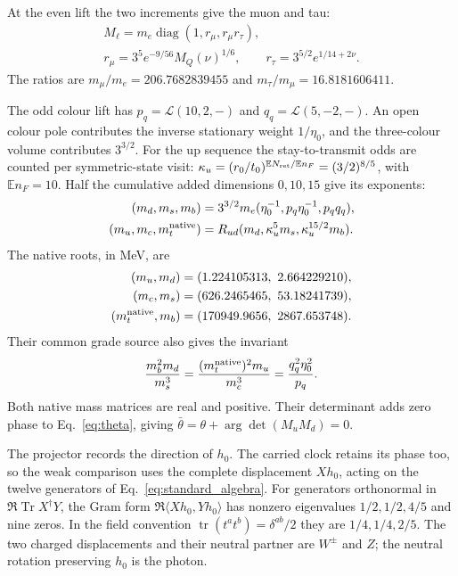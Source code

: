 \documentclass[aps,prx,reprint,longbibliography]{revtex4-2}
\providecommand{\Tr}{\operatorname{Tr}}
\providecommand{\tr}{\operatorname{tr}}
\providecommand{\diag}{\operatorname{diag}}
\providecommand{\E}{\mathbb E}
\begin{document}
At the even lift the two increments give the muon and tau:
\begin{equation}
 \begin{gathered}
 M_\ell=m_e\diag(1,r_\mu,r_\mu r_\tau),\\
 r_\mu=3^5e^{-9/56}M_Q(\nu)^{1/6},\qquad
 r_\tau=3^{5/2}e^{1/14+2\nu}.
 \end{gathered}
 \label{eq:leptons}
\end{equation}
The ratios are $m_\mu/m_e=206.7682839455$ and $m_\tau/m_\mu=16.8181606411$.

The odd colour lift has $p_q=\mathcal L(10,2,-)$ and $q_q=\mathcal L(5,-2,-)$. An open colour pole contributes the inverse stationary weight $1/\eta_0$, and the three-colour volume contributes $3^{3/2}$. For the up sequence the stay-to-transmit odds are counted per symmetric-state visit: $\kappa_u=(r_0/t_0)^{\E N_{\rm ret}/\E n_F}=(3/2)^{8/5}$, with $\E n_F=10$. Half the cumulative added dimensions $0,10,15$ give its exponents:
\begin{equation}
 \begin{split}
 (m_d,m_s,m_b)&=3^{3/2}m_e(\eta_0^{-1},p_q\eta_0^{-1},p_qq_q),\\
 (m_u,m_c,m_t^{\rm native})&=R_{ud}(m_d,\kappa_u^5m_s,\kappa_u^{15/2}m_b).
 \end{split}
 \label{eq:quarks}
\end{equation}
The native roots, in MeV, are
\[
\begin{aligned}
 (m_u,m_d)&=(1.224105313,\ 2.664229210),\\
 (m_c,m_s)&=(626.2465465,\ 53.18241739),\\
 (m_t^{\rm native},m_b)&=(170949.9656,\ 2867.653748).
\end{aligned}
\] Their common grade source also gives the invariant
\begin{equation}
 \frac{m_b^2m_d}{m_s^3}
 =\frac{(m_t^{\rm native})^2m_u}{m_c^3}
 =\frac{q_q^2\eta_0^2}{p_q}.
 \label{eq:quark_invariant}
\end{equation}
Both native mass matrices are real and positive. Their determinant adds zero phase to Eq.~\eqref{eq:theta}, giving $\bar\theta=\theta+\arg\det(M_uM_d)=0$.

The projector records the direction of $h_0$. The carried clock retains its phase too, so the weak comparison uses the complete displacement $Xh_0$, acting on the twelve generators of Eq.~\eqref{eq:standard_algebra}. For generators orthonormal in $\Re\Tr X^\dagger Y$, the Gram form $\Re\langle Xh_0,Yh_0\rangle$ has nonzero eigenvalues $1/2,1/2,4/5$ and nine zeros. In the field convention $\tr(t^at^b)=\delta^{ab}/2$ they are $1/4,1/4,2/5$. The two charged displacements and their neutral partner are $W^\pm$ and $Z$; the neutral rotation preserving $h_0$ is the photon.
\end{document}
